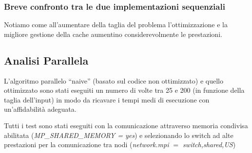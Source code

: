 \documentclass[12pt,a4paper,oneside,openright]{article}
\begin{document}
\subsubsection*{Breve confronto tra le due implementazioni sequenziali}
Notiamo come all'aumentare della taglia del problema l'ottimizzazione e la migliore gestione della cache aumentino considerevolmente le prestazioni.
\begin{figure}[H]
  \centering 
  \quad   {}   
\end{figure}

\subsection{Analisi Parallela}
L'algoritmo parallelo ``naive'' (basato sul codice non ottimizzato) e quello ottimizzato sono stati eseguiti un numero di volte tra 25 e 200 (in funzione della taglia dell'input) in modo da ricavare i tempi medi di esecuzione con un'affidabilità adeguata.

Tutti i test sono stati eseguiti con la comunicazione attraverso memoria condivisa abilitata (\emph{MP\_SHARED\_MEMORY = yes}) e selezionando lo switch ad alte prestazioni per la comunicazione tra nodi (\emph{network.mpi    $=$  switch,shared,US})
\end{document}
